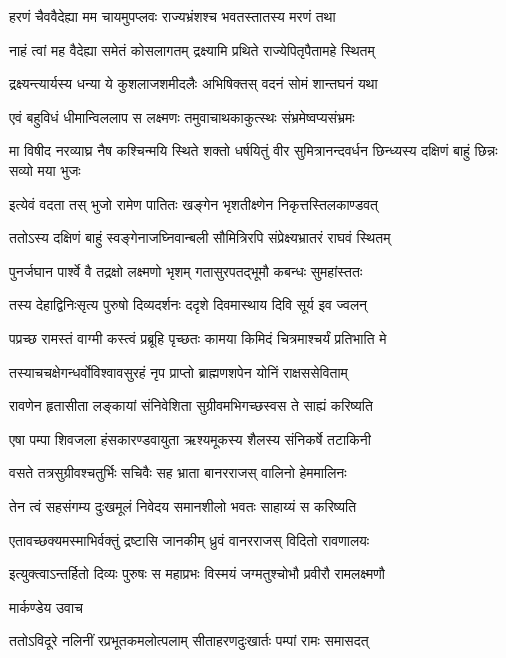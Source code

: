 \twolineshloka
{हरणं चैववैदेह्या मम चायमुपप्लवः}
{राज्यभ्रंशश्च भवतस्तातस्य मरणं तथा}


\twolineshloka
{नाहं त्वां मह वैदेह्या समेतं कोसलागतम्}
{द्रक्ष्यामि प्रथिते राज्येपितृपैतामहे स्थितम्}


\twolineshloka
{द्रक्ष्यन्त्यार्यस्य धन्या ये कुशलाजशमीदलैः}
{अभिषिक्तस् वदनं सोमं शान्तघनं यथा}


\twolineshloka
{एवं बहुविधं धीमान्विललाप स लक्ष्मणः}
{तमुवाचाथकाकुत्स्थः संभ्रमेष्वप्यसंभ्रमः}


\threelineshloka
{मा विषीद नरव्याघ्र नैष कश्चिन्मयि स्थिते}
{शक्तो धर्षयितुं वीर सुमित्रानन्दवर्धन}
{छिन्ध्यस्य दक्षिणं बाहुं छिन्नः सव्यो मया भुजः}


\twolineshloka
{इत्येवं वदता तस् भुजो रामेण पातितः}
{खङ्गेन भृशतीक्ष्णेन निकृत्तस्तिलकाण्डवत्}


\twolineshloka
{ततोऽस्य दक्षिणं बाहुं स्वङ्गेनाजघ्निवान्बली}
{सौमित्रिरपि संप्रेक्ष्यभ्रातरं राघवं स्थितम्}


\twolineshloka
{पुनर्जघान पार्श्वे वै तद्रक्षो लक्ष्मणो भृशम्}
{गतासुरपतद्भूमौ कबन्धः सुमहांस्ततः}


\twolineshloka
{तस्य देहाद्विनिःसृत्य पुरुषो दिव्यदर्शनः}
{ददृशे दिवमास्थाय दिवि सूर्य इव ज्वलन्}


\twolineshloka
{पप्रच्छ रामस्तं वाग्मी कस्त्वं प्रब्रूहि पृच्छतः}
{कामया किमिदं चित्रमाश्चर्यं प्रतिभाति मे}


\twolineshloka
{तस्याचचक्षेगन्धर्वोविश्वावसुरहं नृप}
{प्राप्तो ब्राह्मणशपेन योनिं राक्षससेविताम्}


\twolineshloka
{रावणेन हृतासीता लङ्कायां संनिवेशिता}
{सुग्रीवमभिगच्छस्वस ते साह्यं करिष्यति}


\twolineshloka
{एषा पम्पा शिवजला हंसकारण्डवायुता}
{ऋश्यमूकस्य शैलस्य संनिकर्षे तटाकिनी}


\twolineshloka
{वसते तत्रसुग्रीवश्चतुर्भिः सचिवैः सह}
{भ्राता बानरराजस् वालिनो हेममालिनः}


\twolineshloka
{तेन त्वं सहसंगम्य दुःखमूलं निवेदय}
{समानशीलो भवतः साहाय्यं स करिष्यति}


\twolineshloka
{एतावच्छक्यमस्माभिर्वक्तुं द्रष्टासि जानकीम्}
{ध्रुवं वानरराजस् विदितो रावणालयः}


\twolineshloka
{इत्युक्त्वाऽन्तर्हितो दिव्यः पुरुषः स महाप्रभः}
{विस्मयं जग्मतुश्चोभौ प्रवीरौ रामलक्ष्मणौ}


\twolineshloka
{मार्कण्डेय उवाच}
{}


\twolineshloka
{ततोऽविदूरे नलिनीं रप्रभूतकमलोत्पलाम्}
{सीताहरणदुःखार्तः पम्पां रामः समासदत्}


